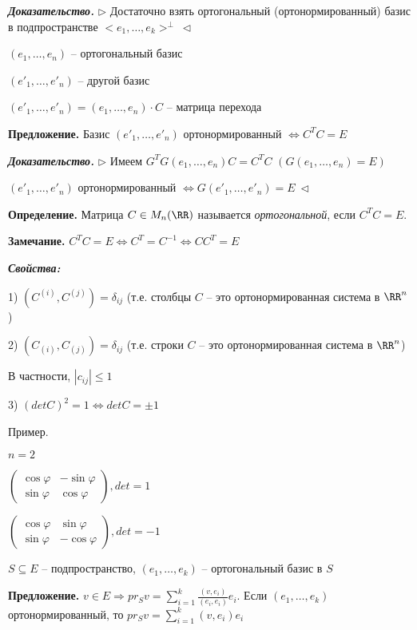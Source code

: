 \bigskip
\textbf{\textit{Доказательство.}} $\rhd$ Достаточно взять ортогональный (ортонормированный) базис в подпространстве $<e_1, \dots, e_k>^{\bot} \ \lhd$

\bigskip
$(e_1, \dots, e_n)$ -- ортогональный базис

$(e'_1, \dots, e'_n)$ -- другой базис

$(e'_1, \dots, e'_n) = (e_1, \dots, e_n) \cdot C$ -- матрица перехода

\bigskip
\textbf{Предложение.} Базис $(e'_1, \dots, e'_n)$ ортонормированный $\Leftrightarrow C^T C = E$

\bigskip
\textbf{\textit{Доказательство.}} $\rhd$ Имеем $G^T G(e_1, \dots, e_n) C = C^T C$ $(G(e_1, \dots, e_n) = E)$

$(e'_1, \dots, e'_n)$ ортонормированный $\Leftrightarrow G(e'_1, \dots, e'_n) = E \ \lhd$

\bigskip
\textbf{Определение.} Матрица $C \in M_n (\RR)$ называется \textit{ортогональной}, если $C^T C = E$.

\bigskip
\textbf{Замечание.} $C^T C = E \Leftrightarrow C^T = C^{-1} \Leftrightarrow C C^T = E$

\bigskip
\textbf{\textit{Свойства:}}

1) $(C^{(i)}, C^{(j)}) = \delta_{ij}$ (т.е. столбцы $C$ -- это ортонормированная система в $\RR^n$)

2) $(C_{(i)}, C_{(j)}) = \delta_{ij}$ (т.е. строки $C$ -- это ортонормированная система в $\RR^n$)

В частности, $|c_{ij}| \leq 1$

3) $(det C)^2 = 1 \Leftrightarrow detC = \pm 1$

\bigskip
Пример.

$n = 2$

$\begin{pmatrix} \cos \varphi & - \sin \varphi \\
\sin \varphi & \cos \varphi \end{pmatrix}, det = 1$

$\begin{pmatrix} \cos \varphi & \sin \varphi \\
\sin \varphi & - \cos \varphi \end{pmatrix}, det = -1$

\bigskip
$S \subseteq E$ -- подпространство, $(e_1, \dots, e_k)$ -- ортогональный базис в $S$

\bigskip
\textbf{Предложение.} $v \in E \Rightarrow pr_S v = \sum\limits_{i=1}^k \frac{(v, e_i)}{(e_i, e_i)} e_i$. Если $(e_1, \dots, e_k)$ ортонормированный, то $pr_S v = \sum\limits_{i=1}^k (v, e_i) e_i$

